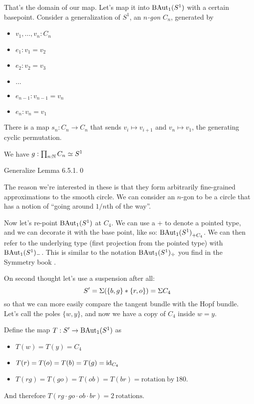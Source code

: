 \documentclass[12pt]{article}
\begin{document}
That's the domain of our map. Let's map it into \( \mathrm{BAut}_1(S^1) \) with a certain basepoint. Consider a generalization of \( S^1 \),  an \emph{\( n \)-gon} \( C_n \), generated by
\begin{itemize}
\item \( v_1,\ldots,v_n:C_n \)
\item \( e_1:v_1=v_2\)
\item \( e_2:v_2=v_3 \)
\item \( \ldots \) 
\item \(e_{n-1}:v_{n-1}=v_n\)
\item \(e_n:v_n=v_1 \)
\end{itemize}

There is a map \( s_n:C_n\to C_n \) that sends \( v_i\mapsto v_{i+1} \) and \( v_n\mapsto v_1 \), the generating cyclic permutation. 

\begin{mylemma}
  We have \( g:\prod_{n:\mathbb{N}}C_n\simeq S^1 \)
\end{mylemma}
\proof Generalize \cite{hottbook} Lemma 6.5.1.\qed

The reason we're interested in these is that they form arbitrarily fine-grained approximations to the smooth circle. We can consider an \( n \)-gon to be a circle that has a notion of ``going around \( 1/n \)th of the way''.

Now let's re-point \( \mathrm{BAut}_1(S^1) \) at \( C_4 \). We can use a + to denote a pointed type, and we can decorate it with the base point, like so: \( {\mathrm{BAut}_1(S^1)}_{+{C_4}} \). We can then refer to the underlying type (first projection from the pointed type) with \( \mathrm{BAut}_1(S^1)_- \). This is similar to the notation \( \mathrm{BAut}_1(S^1)_{\div} \) you find in the Symmetry book \cite{Symmetry}.

On second thought let's use a suspension after all:
\[ 
S'=\Sigma (\{b, g\}*\{r, o\}) =\Sigma C_4
\] so that we can more easily compare the tangent bundle with the Hopf bundle. Let's call the poles \( \{w, y\} \), and now we have a copy of \( C_4 \) inside \( w=y \). 

Define the map \( T:S'\to\mathrm{BAut}_1(S^1) \) as
\begin{itemize}
\item \( T(w)=T(y)=C_4 \)
\item \( T(r)=T(o)=T(b)=T(g)=\text{id}_{C_4} \)
\item \( T(rg)=T(go)=T(ob)=T(br)=\mathrm{rotation\ by\ 180} \).
\end{itemize} 
And therefore \( T(rg\cdot go\cdot ob\cdot br)=\mathrm{2\ rotations} \).
\end{document}
